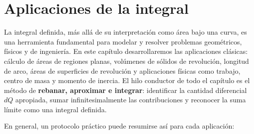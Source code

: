 \chapter{Aplicaciones de la integral}

La integral definida, más allá de su interpretación como área bajo una curva,
es una herramienta fundamental para modelar y resolver problemas geométricos,
físicos y de ingeniería. En este capítulo desarrollaremos las aplicaciones
clásicas: cálculo de áreas de regiones planas, volúmenes de sólidos de
revolución, longitud de arco, áreas de superficies de revolución y
aplicaciones físicas como trabajo, centro de masa y momento de inercia. El
hilo conductor de todo el capítulo es el método de
\textbf{rebanar, aproximar e integrar}: identificar la cantidad diferencial
$dQ$ apropiada, sumar infinitesimalmente las contribuciones y reconocer la
suma límite como una integral definida.

En general, un protocolo práctico puede resumirse así para cada aplicación:

